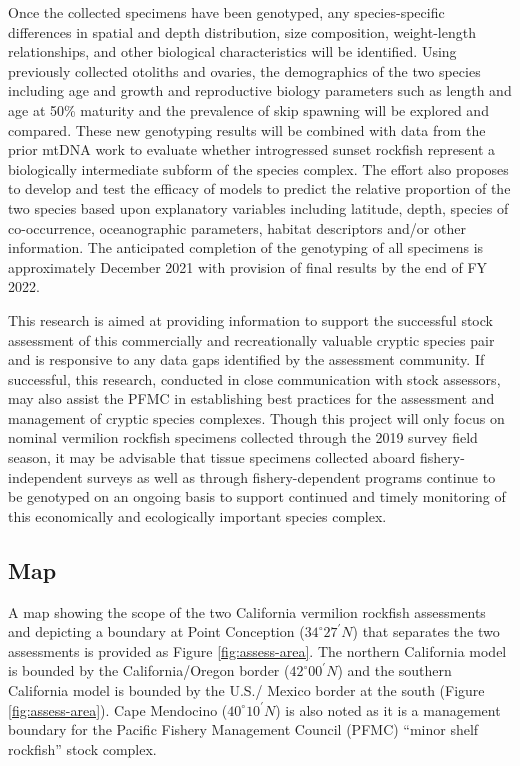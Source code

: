 \documentclass[11pt,
  english,
  a4paper,
]{article}
\begin{document}
Once the collected specimens have been genotyped, any species-specific differences in spatial and depth distribution, size composition, weight-length relationships, and other biological characteristics will be identified. Using previously collected otoliths and ovaries, the demographics of the two species including age and growth and reproductive biology parameters such as length and age at 50\% maturity and the prevalence of skip spawning will be explored and compared. These new genotyping results will be combined with data from the prior mtDNA work to evaluate whether introgressed sunset rockfish represent a biologically intermediate subform of the species complex. The effort also proposes to develop and test the efficacy of models to predict the relative proportion of the two species based upon explanatory variables including latitude, depth, species of co-occurrence, oceanographic parameters, habitat descriptors and/or other information. The anticipated completion of the genotyping of all specimens is approximately December 2021 with provision of final results by the end of FY 2022.

This research is aimed at providing information to support the successful stock assessment of this commercially and recreationally valuable cryptic species pair and is responsive to any data gaps identified by the assessment community. If successful, this research, conducted in close communication with stock assessors, may also assist the PFMC in establishing best practices for the assessment and management of cryptic species complexes. Though this project will only focus on nominal vermilion rockfish specimens collected through the 2019 survey field season, it may be advisable that tissue specimens collected aboard fishery-independent surveys as well as through fishery-dependent programs continue to be genotyped on an ongoing basis to support continued and timely monitoring of this economically and ecologically important species complex.


\hypertarget{map}{%
\subsection{Map}\label{map}}

\leavevmode\tagmcend\tagstructend

A map showing the scope of the two California vermilion rockfish assessments and depicting a boundary at Point Conception ($34^\circ 27^\prime N$) that separates the two assessments is provided as Figure \ref{fig:assess-area}. The northern California model is bounded by the California/Oregon border ($42^\circ 00^\prime N$) and the southern California model is bounded by the U.S./ Mexico border at the south (Figure \ref{fig:assess-area}). Cape Mendocino ($40^\circ 10^\prime N$) is also noted as it is a management boundary for the Pacific Fishery Management Council (PFMC) ``minor shelf rockfish'' stock complex.
\end{document}
